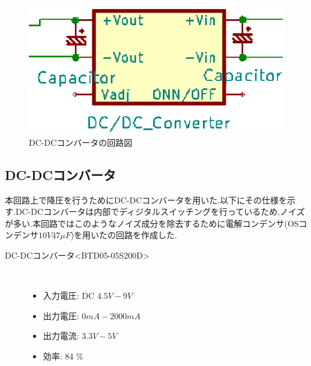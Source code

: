 \begin{figure}[h!]
\centering
\includegraphics[scale=0.8]{picture/eps/ele_cap.eps}
\caption{DC-DCコンバータの回路図}
\label{fig::ele_cap}
\end{figure}

\subsection{DC-DCコンバータ}
本回路上で降圧を行うためにDC-DCコンバータを用いた.以下にその仕様を示す.DC-DCコンバータは内部でディジタルスイッチングを行っているため,ノイズが多い\cite{dcdc}.本回路ではこのようなノイズ成分を除去するために電解コンデンサ(OSコンデンサ$10\unit{V}47\unit{\mu F}$)を用いたの回路を作成した\cite{dcdcconverter}.
\begin{description}
    \item[DC-DCコンバータ\textless BTD05-05S200D\textgreater \cite{dcdcconverter}]\mbox{}\\
    \vspace{-5mm}
        \begin{itemize}
            \item 入力電圧: DC $4.5\unit{V}-9\unit{V}$
            \item 出力電圧: $0\unit{mA}-2000\unit{mA}$
            \item 出力電流: $3.3\unit{V}-5\unit{V}$
            \item 効率: 84 \%
        \end{itemize}
\end{description}


